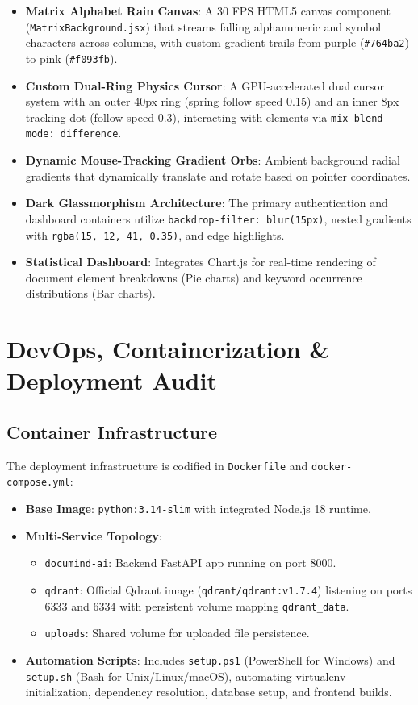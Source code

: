 \documentclass[11pt,a4paper]{article}
\begin{document}
\begin{itemize}[leftmargin=*]
    \item \textbf{Matrix Alphabet Rain Canvas}: A 30 FPS HTML5 canvas component (\texttt{MatrixBackground.jsx}) that streams falling alphanumeric and symbol characters across columns, with custom gradient trails from purple (\texttt{\#764ba2}) to pink (\texttt{\#f093fb}).
    \item \textbf{Custom Dual-Ring Physics Cursor}: A GPU-accelerated dual cursor system with an outer 40px ring (spring follow speed 0.15) and an inner 8px tracking dot (follow speed 0.3), interacting with elements via \texttt{mix-blend-mode: difference}.
    \item \textbf{Dynamic Mouse-Tracking Gradient Orbs}: Ambient background radial gradients that dynamically translate and rotate based on pointer coordinates.
    \item \textbf{Dark Glassmorphism Architecture}: The primary authentication and dashboard containers utilize \texttt{backdrop-filter: blur(15px)}, nested gradients with \texttt{rgba(15, 12, 41, 0.35)}, and edge highlights.
    \item \textbf{Statistical Dashboard}: Integrates Chart.js for real-time rendering of document element breakdowns (Pie charts) and keyword occurrence distributions (Bar charts).
\end{itemize}

\section{DevOps, Containerization \& Deployment Audit}

\subsection{Container Infrastructure}
The deployment infrastructure is codified in \texttt{Dockerfile} and \texttt{docker-compose.yml}:
\begin{itemize}
    \item \textbf{Base Image}: \texttt{python:3.14-slim} with integrated Node.js 18 runtime.
    \item \textbf{Multi-Service Topology}:
    \begin{itemize}
        \item \texttt{documind-ai}: Backend FastAPI app running on port 8000.
        \item \texttt{qdrant}: Official Qdrant image (\texttt{qdrant/qdrant:v1.7.4}) listening on ports 6333 and 6334 with persistent volume mapping \texttt{qdrant\_data}.
        \item \texttt{uploads}: Shared volume for uploaded file persistence.
    \end{itemize}
    \item \textbf{Automation Scripts}: Includes \texttt{setup.ps1} (PowerShell for Windows) and \texttt{setup.sh} (Bash for Unix/Linux/macOS), automating virtualenv initialization, dependency resolution, database setup, and frontend builds.
\end{itemize}
\end{document}
